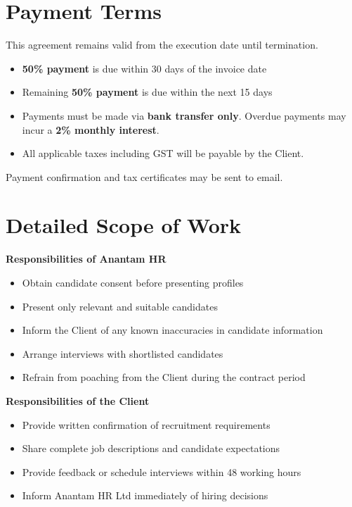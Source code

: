 \documentclass[12pt]{article}
\begin{document}
\section{Payment Terms}

This agreement remains valid from the execution date until termination.

\begin{itemize}
\item \textbf{50\% payment} is due within 30 days of the invoice date
\item Remaining \textbf{50\% payment} is due within the next 15 days
\item Payments must be made via \textbf{bank transfer only}. Overdue payments may incur a \textbf{2\% monthly interest}.
\item All applicable taxes including GST will be payable by the Client.
\end{itemize}

Payment confirmation and tax certificates may be sent to email.

\section{Detailed Scope of Work}

\textbf{Responsibilities of Anantam HR}

\begin{itemize}
\item Obtain candidate consent before presenting profiles
\item Present only relevant and suitable candidates
\item Inform the Client of any known inaccuracies in candidate information
\item Arrange interviews with shortlisted candidates
\item Refrain from poaching from the Client during the contract period
\end{itemize}

\textbf{Responsibilities of the Client}

\begin{itemize}
\item Provide written confirmation of recruitment requirements
\item Share complete job descriptions and candidate expectations
\item Provide feedback or schedule interviews within 48 working hours
\item Inform Anantam HR Ltd immediately of hiring decisions
\end{itemize}
\end{document}
